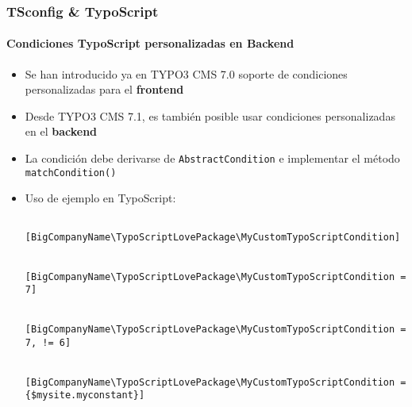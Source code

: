 
\begin{frame}[fragile]
	\frametitle{TSconfig \& TypoScript}
	\framesubtitle{Condiciones TypoScript personalizadas en Backend}

	\lstset{basicstyle=\tiny\ttfamily}

	\begin{itemize}
	
		\item Se han introducido ya en TYPO3 CMS 7.0 soporte de condiciones personalizadas para el \textbf{frontend}
		\item Desde TYPO3 CMS 7.1, es también posible usar condiciones personalizadas en el \textbf{backend}
		\item La condición debe derivarse de \texttt{AbstractCondition} e implementar el método \texttt{matchCondition()}
		\item Uso de ejemplo en TypoScript:

			\begin{lstlisting}
				[BigCompanyName\TypoScriptLovePackage\MyCustomTypoScriptCondition]

				[BigCompanyName\TypoScriptLovePackage\MyCustomTypoScriptCondition = 7]

				[BigCompanyName\TypoScriptLovePackage\MyCustomTypoScriptCondition = 7, != 6]

				[BigCompanyName\TypoScriptLovePackage\MyCustomTypoScriptCondition = {$mysite.myconstant}]
			\end{lstlisting}

	\end{itemize}

\end{frame}


